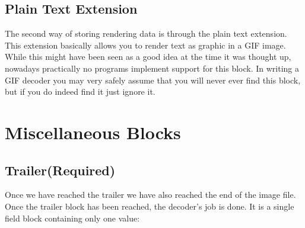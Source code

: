 \begin{algorithm}[H]
\begin{algorithmic}[1]

        \EndIf

        \Else
        \EndIf

        \State {}



          \State {}

          \EndIf
      \EndIf



      \EndWhile

    \end{algorithmic}
  \end{algorithm}

  \subsection{Plain Text Extension}

  The second way of storing rendering data is through the plain text
  extension. This extension basically allows you to render text as
  graphic in a GIF image. While this might have been seen as a good
  idea at the time it was thought up, nowadays practically no programs
  implement support for this block. In writing a GIF decoder you may
  very safely assume that you will never ever find this block, but if
  you do indeed find it just ignore it.

  \section{Miscellaneous Blocks}

  \subsection{Trailer(Required)}

  Once we have reached the trailer we have also reached the end of the
  image file. Once the trailer block has been reached, the decoder's
  job is done. It is a single field block containing only one value:

